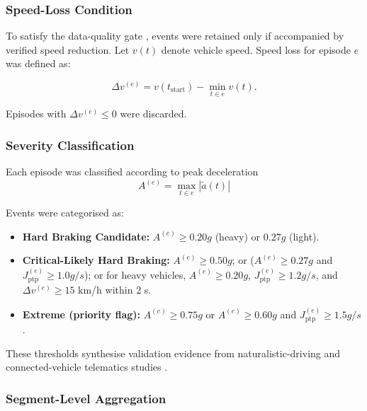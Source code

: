 \documentclass[letterpaper,8pt]{extarticle}  %
\begin{document}
\begin{doublespacing}
\begin{linenumbers}
\subsubsection*{Speed-Loss Condition}

To satisfy the data-quality gate \citep{Liu2023Smartphone-basedServices}, events were retained only if accompanied by verified speed reduction. Let $v(t)$ denote vehicle speed. Speed loss for episode $e$ was defined as:

\begin{equation}
\Delta v^{(e)} = v(t_{\text{start}}) - \min_{t \in e} v(t).
\end{equation}

Episodes with $\Delta v^{(e)} \leq 0$ were discarded.

\subsubsection*{Severity Classification}

Each episode was classified according to peak deceleration
\[
A^{(e)} = \max_{t \in e} |\tilde{a}(t)|
\]


Events were categorised as:

\begin{itemize}
    \item \textbf{Hard Braking Candidate:} 
    $A^{(e)} \geq 0.20g$ (heavy) or $0.27g$ (light).

    \item \textbf{Critical-Likely Hard Braking:} 
    $A^{(e)} \geq 0.50g$; or
    ($A^{(e)} \geq 0.27g$ and $J^{(e)}_{\text{ptp}} \geq 1.0g/s$); or
    for heavy vehicles,
    $A^{(e)} \geq 0.20g$, $J^{(e)}_{\text{ptp}} \geq 1.2g/s$,
    and $\Delta v^{(e)} \geq 15$ km/h within 2 s.

    \item \textbf{Extreme (priority flag):}
    $A^{(e)} \geq 0.75g$ or
    $A^{(e)} \geq 0.60g$ and $J^{(e)}_{\text{ptp}} \geq 1.5g/s$.
\end{itemize}

These thresholds synthesise validation evidence from naturalistic-driving and connected-vehicle telematics studies \citep{Bagdadi2013AssessingStudies,Desai2020CorrelatingIndiana,Liu2023Smartphone-basedServices,Hossain2026EvaluatingTelematics}.

\subsubsection*{Segment-Level Aggregation}


\end{linenumbers}
\end{doublespacing}
\end{document}

